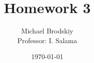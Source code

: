 


\title{Homework 3}
\date{\today}
\author{Michael Brodskiy\\ \small Professor: I. Salama}



\maketitle

